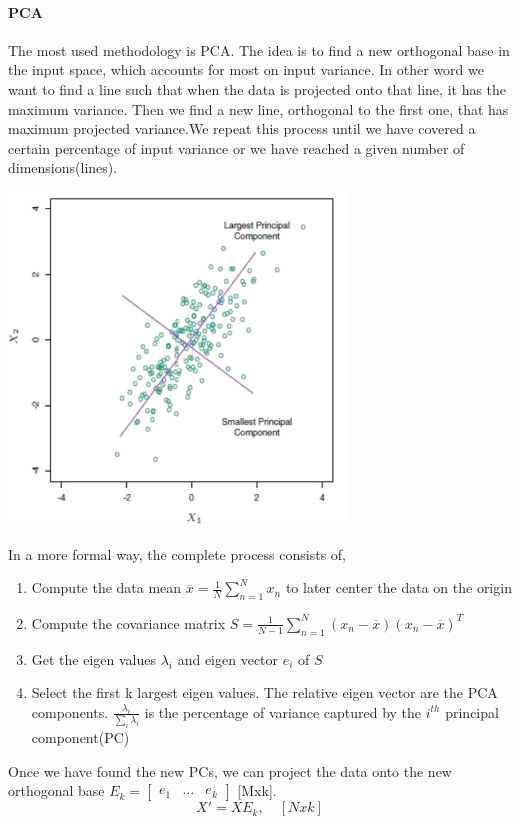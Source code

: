 \documentclass[main.tex]{subfiles}
\begin{document}
\paragraph{PCA} The most used methodology is PCA. The idea is to find a new orthogonal base in the input space, which accounts for most on input variance. In other word we want to find a line such that when the data is projected onto that line, it has the maximum variance. Then we find a new line, orthogonal to the first one, that has maximum projected variance.We repeat this process until we have covered a certain percentage of input variance or we have reached a given number of dimensions(lines).
\begin{center}
   \includegraphics[width=90mm]{img/PCA.png} \\
\end{center}
In a more formal way, the complete process consists of,
\begin{enumerate}
    \item Compute the data mean $\overline{x} = \frac{1}{N} \sum_{n=1}^N x_n$ to later center the data on the origin
    \item Compute the covariance matrix $S = \frac{1}{N-1} \sum_{n=1}^N (x_n-\overline{x})(x_n-\overline{x})^T$
    \item Get the eigen values $\lambda_i$ and eigen vector $e_i$ of $S$
    \item Select the first k largest eigen values. The relative eigen vector are the PCA components. $\frac{\lambda_i}{\sum_i \lambda_i}$ is the percentage of variance captured by the $i^{th}$ principal component(PC)
\end{enumerate}
Once we have found the new PCs, we can project the data onto the new orthogonal base $E_k = \begin{bmatrix} e_1 & \dots & e_k \end{bmatrix}$ [Mxk].
\begin{equation}
    X'=XE_k, \quad [Nxk]
\end{equation}
\end{document}

